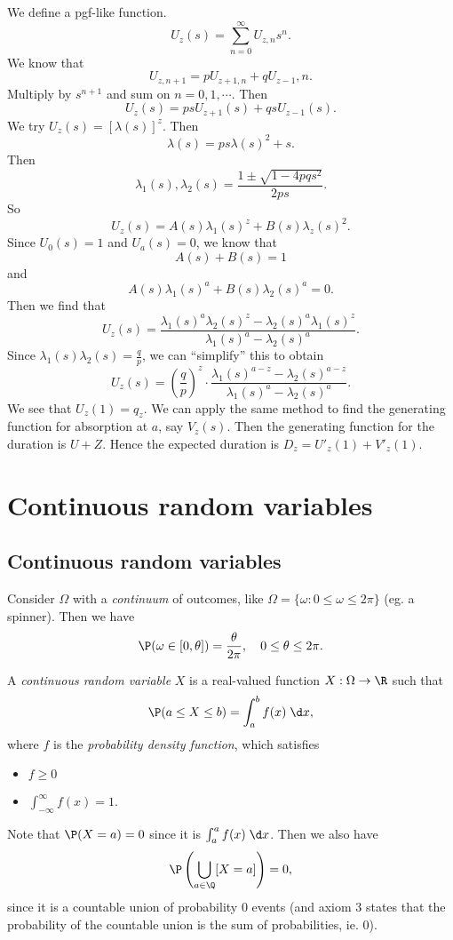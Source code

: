 \documentclass[a4paper]{article}
\begin{document}
We define a pgf-like function.
\[
  U_z(s) = \sum_{n = 0 }^\infty U_{z, n}s^n.
\]
We know that
\[
  U_{z, n + 1} = p U_{z + 1, n} + qU_{z - 1}, n.
\]
Multiply by $s^{n + 1}$ and sum on $n = 0, 1, \cdots$. Then
\[
  U_z(s) = psU_{z + 1}(s) + qsU_{z - 1}(s).
\]
We try $U_z(s) = [\lambda(s)]^z$. Then
\[
  \lambda(s) = ps\lambda(s)^2 + s.
\]
Then
\[
  \lambda_1(s), \lambda_2(s) = \frac{1 \pm \sqrt{1 - 4pqs^2}}{2ps}.
\]
So
\[
  U_z(s) = A(s) \lambda_1(s)^z + B(s)\lambda_z(s)^2.
\]
Since $U_0(s) = 1$ and $U_a(s) = 0$, we know that
\[
  A(s) + B(s) = 1
\]
and
\[
  A(s)\lambda_1(s)^a + B(s)\lambda_2(s)^a = 0.
\]
Then we find that
\[
  U_z(s) = \frac{\lambda_1(s)^a\lambda_2(s)^z - \lambda_2(s)^a\lambda_1(s)^z}{\lambda_1(s)^a - \lambda_2(s)^a}.
\]
Since $\lambda_1(s)\lambda_2(s) = \frac{q}{p}$, we can ``simplify'' this to obtain
\[
  U_z(s) = \left(\frac{q}{p}\right)^z \cdot \frac{\lambda_1(s)^{a - z} - \lambda_2(s)^{a - z}}{\lambda_1(s)^a - \lambda_2(s)^a}.
\]
We see that $U_z(1) = q_z$. We can apply the same method to find the generating function for absorption at $a$, say $V_z(s)$. Then the generating function for the duration is $U + Z$. Hence the expected duration is $D_z = U'_z(1) + V'_z(1).$
\section{Continuous random variables}
\subsection{Continuous random variables}
Consider $\Omega$ with a \emph{continuum} of outcomes, like $\Omega = \{\omega: 0 \leq \omega \leq 2\pi\}$ (eg. a spinner). Then we have
\[
  \P(\omega \in [0, \theta]) = \frac{\theta}{2\pi}, \quad 0 \leq \theta \leq 2\pi.
\]
\begin{defi}
  A \emph{continuous random variable} $X$ is a real-valued function $X: \Omega \to \R$ such that
  \[
    \P(a \leq X \leq b) = \int_a^b f(x) \;\d x,
  \]
  where $f$ is the \emph{probability density function}, which satisfies
  \begin{itemize}
    \item $f \geq 0$
    \item $\int_{-\infty}^\infty f(x) = 1$.
  \end{itemize}
\end{defi}
Note that $\P(X = a) = 0$ since it is $\int_a^a f(x)\;\d x$. Then we also have
\[
  \P\left(\bigcup_{a\in \Q} [X = a]\right) = 0,
\]
since it is a countable union of probability 0 events (and axiom 3 states that the probability of the countable union is the sum of probabilities, ie. 0).
\end{document}
